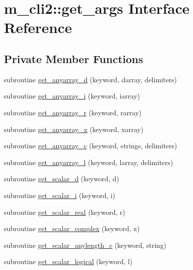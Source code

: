 \hypertarget{interfacem__cli2_1_1get__args}{}\section{m\+\_\+cli2\+:\+:get\+\_\+args Interface Reference}
\label{interfacem__cli2_1_1get__args}
\subsection*{Private Member Functions}
\begin{DoxyCompactItemize}
\item 
subroutine \mbox{\hyperlink{interfacem__cli2_1_1get__args_ac1595f7435cd331533eade965bb371dc}{get\+\_\+anyarray\+\_\+d}} (keyword, darray, delimiters)
\item 
subroutine \mbox{\hyperlink{interfacem__cli2_1_1get__args_aa187fa2af2a944d760738023c142a80f}{get\+\_\+anyarray\+\_\+i}} (keyword, iarray)
\item 
subroutine \mbox{\hyperlink{interfacem__cli2_1_1get__args_a0cbc531fe929d06c07eb434b366541b6}{get\+\_\+anyarray\+\_\+r}} (keyword, rarray)
\item 
subroutine \mbox{\hyperlink{interfacem__cli2_1_1get__args_a66a3ba683da196f5f0d423345332c88c}{get\+\_\+anyarray\+\_\+x}} (keyword, xarray)
\item 
subroutine \mbox{\hyperlink{interfacem__cli2_1_1get__args_aa60d116ceb254630c102ef174471e375}{get\+\_\+anyarray\+\_\+c}} (keyword, strings, delimiters)
\item 
subroutine \mbox{\hyperlink{interfacem__cli2_1_1get__args_a3ff3d0bd398e40fd207c2aa09b5bf8a9}{get\+\_\+anyarray\+\_\+l}} (keyword, larray, delimiters)
\item 
subroutine \mbox{\hyperlink{interfacem__cli2_1_1get__args_a118d13d610c68afb422c2dbefa07c6f8}{get\+\_\+scalar\+\_\+d}} (keyword, d)
\item 
subroutine \mbox{\hyperlink{interfacem__cli2_1_1get__args_a40f19581d7e5bcf7450391e2ac2b26a3}{get\+\_\+scalar\+\_\+i}} (keyword, i)
\item 
subroutine \mbox{\hyperlink{interfacem__cli2_1_1get__args_aa6f39c9132687c0396d3b054bc5e47f6}{get\+\_\+scalar\+\_\+real}} (keyword, r)
\item 
subroutine \mbox{\hyperlink{interfacem__cli2_1_1get__args_a6c9a2315891b94aa062c34c82082a9da}{get\+\_\+scalar\+\_\+complex}} (keyword, x)
\item 
subroutine \mbox{\hyperlink{interfacem__cli2_1_1get__args_a42c3b7050881edf76682b7b0058b868a}{get\+\_\+scalar\+\_\+anylength\+\_\+c}} (keyword, string)
\item 
subroutine \mbox{\hyperlink{interfacem__cli2_1_1get__args_a067f9a7dd7edb825afb728f069b3233e}{get\+\_\+scalar\+\_\+logical}} (keyword, l)
\end{DoxyCompactItemize}


